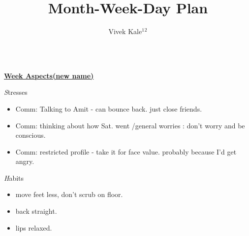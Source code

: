 \documentclass[serif,mathserif,final]{beamer}
\title{Month-Week-Day Plan}
\author{Vivek Kale$^1$$^2$}
\institute{$^1$ University of Illinois at Urbana-Champaign \quad}
\begin{document}
 
\begin{frame}{} 

  \begin{columns}[t]
\begin{column}{0.30\linewidth} {\textbf{\underline{Week Aspects(new name)}}}
  \begin{block}{\textit Stresses} 
    \begin{itemize}
    \item \tiny Comm: Talking to Amit - can bounce back. just close friends. 
     \item \tiny Comm:  thinking about how Sat. went /general worries : don't worry and be conscious. 
       \item \tiny Comm: restricted profile - take it for face value. probably because I'd get angry. 
    \end{itemize} 
  \end{block} 
  
  \begin{block}{\textit Habits } 
    \begin{itemize} 
      \tiny \item \tiny move feet less, don't scrub on floor. 
    \item \tiny back straight. 
    \item \tiny lips relaxed. 
    \end{itemize} 
  \end{block} 


\end{column}
\end{columns}
\end{frame}
\end{document}
